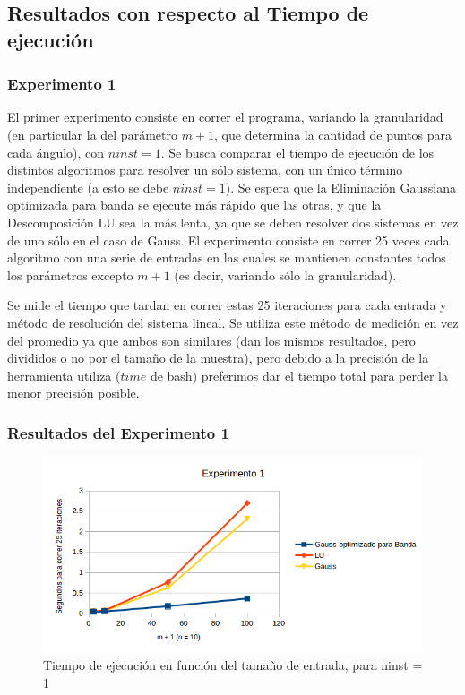 \subsection{Resultados con respecto al Tiempo de ejecuci\'on}

\subsubsection{Experimento 1}
\par El primer experimento consiste en correr el programa, variando la granularidad (en particular la del par\'ametro $m+1$, que determina la cantidad de puntos para cada \'angulo), con $ninst = 1$.
Se busca comparar el tiempo de ejecuci\'on de los distintos algoritmos para resolver un s\'olo sistema, con un \'unico t\'ermino independiente (a esto se debe $ninst = 1$).
Se espera que la Eliminaci\'on Gaussiana optimizada para banda se ejecute m\'as r\'apido que las otras, y que la Descomposici\'on LU sea la m\'as lenta, ya que se deben resolver dos sistemas en vez de uno s\'olo en el caso de Gauss.
El experimento consiste en correr 25 veces cada algoritmo con una serie de entradas en las cuales se mantienen constantes todos los par\'ametros excepto $m+1$ (es decir, variando s\'olo la granularidad). 
\par Se mide el tiempo que tardan en correr estas 25 iteraciones para cada entrada y m\'etodo de resoluci\'on del sistema lineal.
Se utiliza este m\'etodo de medici\'on en vez del promedio ya que ambos son similares (dan los mismos resultados, pero divididos o no por el tama\~no de la muestra), pero debido a la precisi\'on de la herramienta utiliza ($time$ de bash) preferimos dar el tiempo total para perder la menor precisi\'on posible.
\FloatBarrier

\subsubsection{Resultados del Experimento 1} 
\begin{figure}[ht]
\begin{center}
\includegraphics[width=0.8\columnwidth]{../src/experimentos/exp1-3/exp1figura}
\caption{Tiempo de ejecuci\'on en funci\'on del tama\~no de entrada, para ninst = 1}
\label{fig:figura1}
\end{center}
\end{figure}

